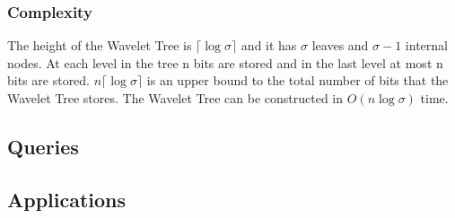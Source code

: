 \subsubsection{Complexity}
The height of the Wavelet Tree is  $\lceil \log \sigma \rceil$ and it has $\sigma$ leaves and $\sigma - 1$ internal nodes. At each level in the tree n bits are stored and in the last level at most n bits are stored. $n \lceil \log \sigma \rceil$ is an upper bound to the total number of bits that the Wavelet Tree stores. The Wavelet Tree can be constructed in $O(n \log \sigma)$ time.

\subsection{Queries}

\subsection{Applications}





